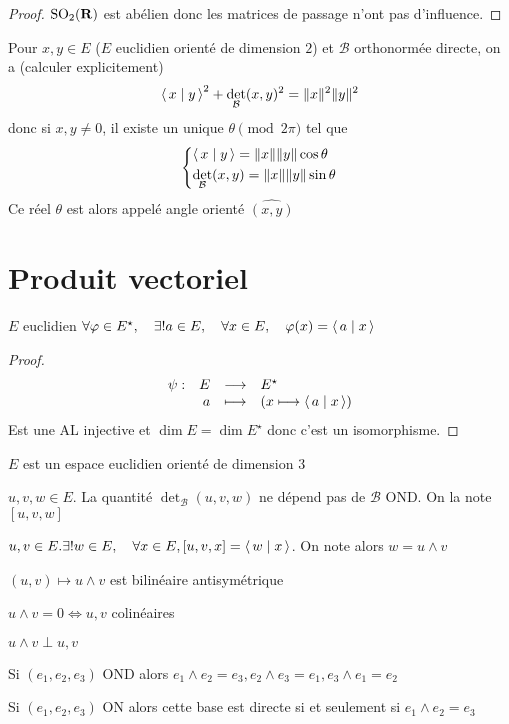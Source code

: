 \begin{proof}
    $\mathrm {SO}_2(\mathbf R)$ est abélien donc les matrices de passage n'ont pas d'influence.
\end{proof}

\begin{rem}
    Pour $x, y \in  E$ ($E$ euclidien orienté de dimension  $2$) et $\mathcal  B$ orthonormée directe, on a (calculer explicitement) \[
        \scalar{x}{y} ^2 + \det_{\mathcal  B}(x, y)^2 = \|x\|^2 \|y\|^2 
    \] 
    donc si $x, y\neq 0$, il existe un unique $\theta \pmod{2\pi}$ tel que \[
    \begin{dcases}
        \scalar{x}{y} = \|x\|\|y\|\cos \theta \\
        \det_{\mathcal  B}(x, y)= \|x\|\|y\|\sin \theta
    \end{dcases}
    \] 
    Ce réel $\theta$ est alors appelé angle orienté  $\widehat{(x, y)}$
\end{rem}

\section{Produit vectoriel}

\begin{thm}
\Hyp $E$ euclidien
\Conc $\forall \varphi \in  E^\star, \quad  \exists  ! a \in  E, \quad  \forall  x \in  E, \quad  \varphi(x)=\scalar{a}{x} $
\end{thm}

\begin{proof}
    \[
    \begin{array}{rrcl}
        \psi:& E & \longrightarrow &  E^\star \\
             & a & \longmapsto & \displaystyle (x \longmapsto \scalar{a}{x} )
    \end{array}
    \] 
    Est une AL injective et $\dim E=\dim E^\star$ donc c'est un isomorphisme.
\end{proof}

\begin{thmdef}
\Hyp $E$ est un espace euclidien orienté de dimension  $3$
 \begin{concenum}
 \item $u, v, w \in  E$. La quantité $\det_{\mathcal  B}(u,v,w)$ ne dépend pas de $ \mathcal  B$ OND. On la note $[u, v, w]$
 \item  $u, v \in  E. \exists !w \in  E, \quad  \forall  x \in  E, [u, v, x]= \scalar{w}{x} $. On note alors $w=u\wedge v$
 \item  $(u,v)\longmapsto u\wedge v$ est bilinéaire antisymétrique
 \item $u\wedge v=0 \iff  u,v$ colinéaires
 \item $u\wedge v\perp u,v$
 \item Si  $(e_1, e_2, e_3)$ OND alors  $e_1\wedge e_2=e_3, e_2\wedge e_3=e_1, e_3\wedge e_1=e_2$
 \item Si  $(e_1, e_2, e_3)$ ON alors cette base est directe  si et seulement si $e_1\wedge e_2=e_3$
\end{concenum}
\end{thmdef}
